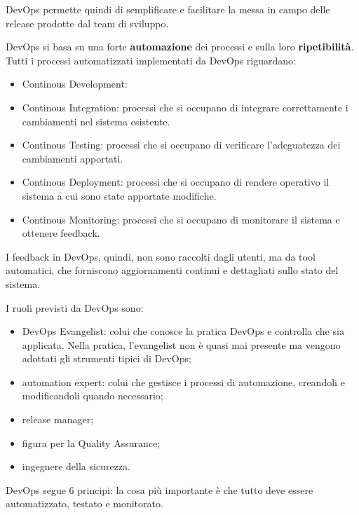 DevOps permette quindi di semplificare e facilitare la messa in campo delle release prodotte dal team di sviluppo.

DevOps si basa su una forte \textbf{automazione} dei processi e sulla loro \textbf{ripetibilità}.
Tutti i processi automatizzati implementati da DevOps riguardano:
\begin{itemize}
    \item Continous Development: 
    \item Continous Integration: processi che si occupano di integrare correttamente i cambiamenti nel sistema esistente.
    \item Continous Testing: processi che si occupano di verificare l'adeguatezza dei cambiamenti apportati.
    \item Continous Deployment: processi che si occupano di rendere operativo il sistema a cui sono state apportate modifiche.
    \item Continous Monitoring: processi che si occupano di monitorare il sistema e ottenere feedback.
\end{itemize}

I feedback in DevOps, quindi, non sono raccolti dagli utenti, ma da tool automatici, che forniscono aggiornamenti continui e dettagliati sullo stato del sistema.

I ruoli previsti da DevOps sono:
\begin{itemize}
    \item DevOps Evangelist: colui che conosce la pratica DevOps e controlla che sia applicata. Nella pratica, l'evangelist non è quasi mai presente ma vengono adottati gli strumenti tipici di DevOps;
    \item automation expert: colui che gestisce i processi di automazione, creandoli e modificandoli quando necessario;
    \item release manager;
    \item figura per la Quality Assurance;
    \item ingegnere della sicurezza.
\end{itemize}

DevOps segue 6 principi: la cosa più importante è che tutto deve essere automatizzato, testato e monitorato.

